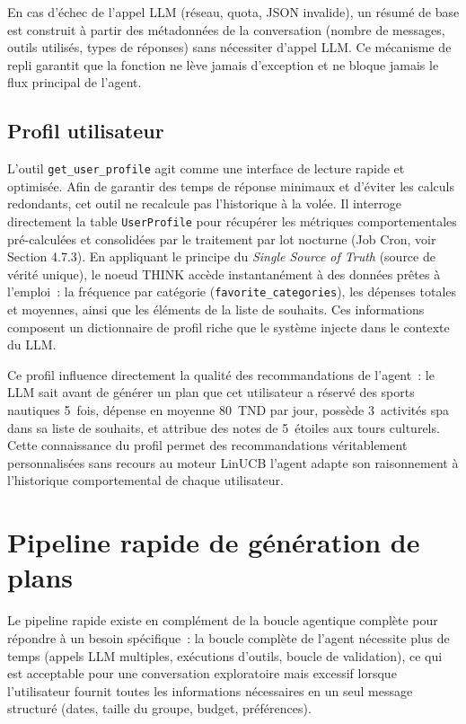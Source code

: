 En cas d'échec de l'appel LLM (réseau, quota, JSON invalide), un résumé de base est construit
à partir des métadonnées de la conversation (nombre de messages, outils utilisés, types de
réponses) sans nécessiter d'appel LLM. Ce mécanisme de repli garantit que la fonction ne
lève jamais d'exception et ne bloque jamais le flux principal de l'agent.


\subsection{Profil utilisateur}

L'outil \texttt{get\_user\_profile} agit comme une interface de lecture rapide et optimisée. 
Afin de garantir des temps de réponse minimaux et d'éviter les calculs redondants, cet outil 
ne recalcule pas l'historique à la volée. Il interroge directement la table \texttt{UserProfile} pour 
récupérer les métriques comportementales pré-calculées et consolidées par le traitement par lot nocturne 
(Job Cron, voir Section 4.7.3). En appliquant le principe du \textit{Single Source of Truth} (source de vérité unique), 
le noeud THINK accède instantanément à des données prêtes à l'emploi~: la fréquence par catégorie 
(\texttt{favorite\_categories}), les dépenses totales et moyennes, ainsi que les éléments de la liste de souhaits. 
Ces informations composent un dictionnaire de profil riche que le système injecte dans le contexte du LLM.

Ce profil influence directement la qualité des recommandations de l'agent~: le LLM sait avant
de générer un plan que cet utilisateur a réservé des sports nautiques 5~fois, dépense en
moyenne 80~TND par jour, possède 3~activités spa dans sa liste de souhaits, et attribue des
notes de 5~étoiles aux tours culturels. Cette connaissance du profil permet des recommandations
véritablement personnalisées sans recours au moteur LinUCB   l'agent adapte son raisonnement
à l'historique comportemental de chaque utilisateur.


\section{Pipeline rapide de génération de plans}

Le pipeline rapide existe en complément de la boucle agentique complète pour répondre à un
besoin spécifique~: la boucle complète de l'agent nécessite plus de temps (appels LLM
multiples, exécutions d'outils, boucle de validation), ce qui est acceptable pour une
conversation exploratoire mais excessif lorsque l'utilisateur fournit toutes les informations
nécessaires en un seul message structuré (dates, taille du groupe, budget, préférences).

